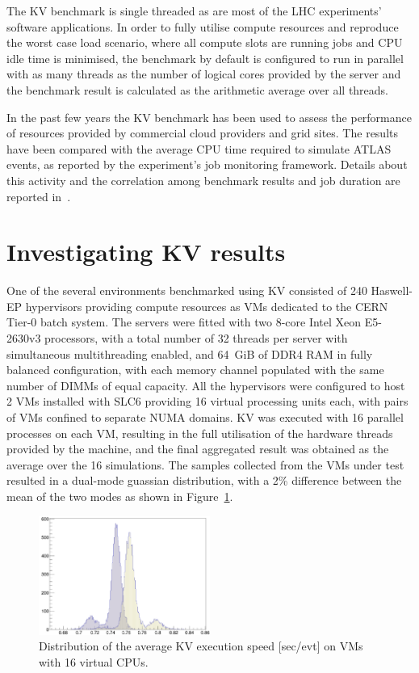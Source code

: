 The KV benchmark is single threaded as are most of the LHC experiments'
software applications. In order to fully utilise compute resources and reproduce
the worst case load scenario, where all compute slots are running jobs and
CPU idle time is minimised, the benchmark by default is configured to run in parallel 
with as many threads as the number of logical cores 
provided by the server and the benchmark result is calculated as the arithmetic 
average over all threads.

In the past few years the KV benchmark has been used to assess the performance of
resources provided by commercial cloud providers and grid sites. The results 
have been compared with the average CPU time required to simulate ATLAS events, 
as reported by the experiment's job monitoring framework. Details about this activity 
and the correlation among benchmark results and job duration are reported 
in~\cite{bmk}.


\section{Investigating KV results}
One of the several environments benchmarked using KV consisted of
 240 Haswell-EP hypervisors providing compute
resources as VMs dedicated to the CERN Tier-0 batch system. The servers were
fitted with two 8-core Intel Xeon E5-2630v3 processors, with a total number  
of 32 threads per server with simultaneous multithreading enabled, and 64~GiB    
of DDR4 RAM in fully balanced configuration, with each memory channel populated with
the same number of DIMMs of equal capacity. All the hypervisors were configured 
to host 2 VMs installed with SLC6 providing 16 virtual processing units each, with pairs of VMs 
confined to separate NUMA domains. KV was executed with 16 parallel processes 
on each VM, resulting in the full utilisation of the hardware threads provided
by the machine, and the final aggregated result was obtained as the average over 
the 16 simulations. The samples collected from the VMs under test resulted in a dual-mode guassian 
distribution, with a 2\% difference between the 
mean of the two modes as shown in Figure~\ref{dual-mode-gaussian}.


\begin{figure}[ht]
\begin{center}
\includegraphics[width=0.5\textwidth]{images/dual-mode-gaussian.png}
\end{center}
\caption{\label{dual-mode-gaussian} Distribution of the average KV execution speed [sec/evt] on  VMs with 16 virtual CPUs. }
\end{figure}


